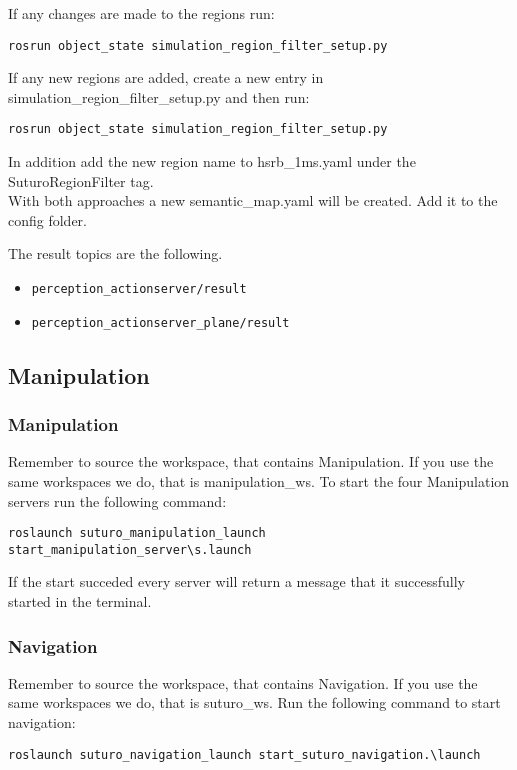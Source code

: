 \documentclass[main.tex]{subfiles}
\begin{document}
If any changes are made to the regions run:\\
\begin{lstlisting}
rosrun object_state simulation_region_filter_setup.py
\end{lstlisting}
If any new regions are added, create a new entry in simulation\_region\_filter\_setup.py and then run:\\
\begin{lstlisting}
rosrun object_state simulation_region_filter_setup.py
\end{lstlisting}
In addition add the new region name to hsrb\_1ms.yaml under the SuturoRegionFilter tag.\\
With both approaches a new semantic\_map.yaml will be created. Add it to the config folder.

The result topics are the following.\\
\begin{itemize}
\item \begin{verbatim}
perception_actionserver/result
\end{verbatim}
\item \begin{verbatim}
perception_actionserver_plane/result
\end{verbatim}
\end{itemize}

	
	\subsection{Manipulation}
	\subsubsection{Manipulation}
	Remember to source the workspace, that contains Manipulation.
	If you use the same workspaces we do, that is manipulation\_ws.
	To start the four Manipulation servers run the following command:\\
	\begin{lstlisting}
roslaunch suturo_manipulation_launch start_manipulation_server\s.launch
\end{lstlisting}
	If the start succeded every server will return a message that it successfully started in the terminal.	
	
	\subsubsection{Navigation}
	Remember to source the workspace, that contains Navigation.
	If you use the same workspaces we do, that is suturo\_ws.
	Run the following command to start navigation:\\
	\begin{lstlisting}
roslaunch suturo_navigation_launch start_suturo_navigation.\launch
\end{lstlisting}
	
\end{document}
